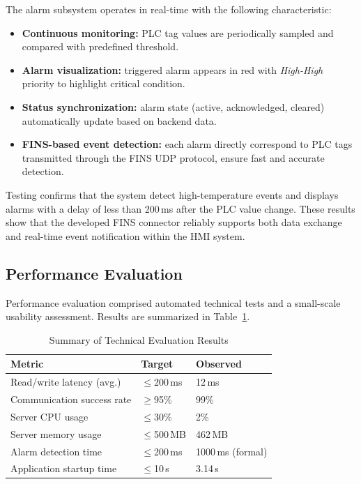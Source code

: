 The alarm subsystem operates in real-time with the following characteristic:
\begin{itemize}
\item \textbf{Continuous monitoring:} PLC tag values are periodically sampled and compared with predefined threshold.
\item \textbf{Alarm visualization:} triggered alarm appears in red with \textit{High-High} priority to highlight critical condition.
\item \textbf{Status synchronization:} alarm state (active, acknowledged, cleared) automatically update based on backend data.
\item \textbf{FINS-based event detection:} each alarm directly correspond to PLC tags transmitted through the FINS UDP protocol, ensure fast and accurate detection.
\end{itemize}

Testing confirms that the system detect high-temperature events and displays alarms with a delay of less than 200\,ms after the PLC value change. These results show that the developed FINS connector reliably supports both data exchange and real-time event notification within the HMI system.


\subsection{Performance Evaluation}

Performance evaluation comprised automated technical tests and a small-scale usability assessment. Results are summarized in Table~\ref{tab:eval-results-summary}.

\begin{table}[H]
  \centering
  \caption{Summary of Technical Evaluation Results}
  \label{tab:eval-results-summary}
  \renewcommand{\arraystretch}{1.05}
  \begin{tabular}{p{3.2cm} p{1.4cm} p{1.6cm}}
    \toprule
    \textbf{Metric} & \textbf{Target} & \textbf{Observed} \\
    \midrule
    Read/write latency (avg.) & $\leq$200\,ms & 12\,ms \\
    Communication success rate & $\geq$95\% & 99\% \\
    Server CPU usage & $\leq$30\% & 2\% \\
    Server memory usage & $\leq$500\,MB & 462\,MB \\
    Alarm detection time & $\leq$200\,ms & 1000\,ms (formal) \\
    Application startup time & $\leq$10\,s & 3.14\,s \\
    \bottomrule
  \end{tabular}
\end{table}


